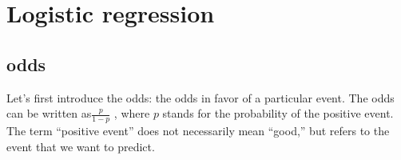 \chapter{Logistic regression}
\section{odds}
Let's first introduce the odds: the odds in favor of a particular event. The odds can be written as$\frac{p}{1-p}$ , where $p$ stands for the probability of the positive event. The term “positive event” does not necessarily mean “good,” but refers to the event that we want to predict.